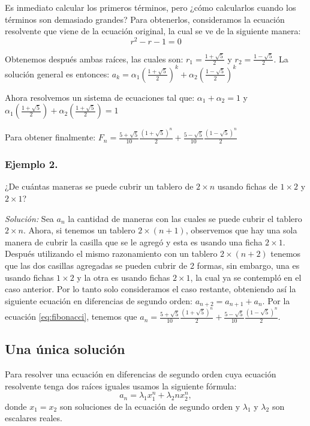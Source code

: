 \documentclass{article}
\begin{document}
Es inmediato calcular los primeros términos, pero ¿cómo calcularlos
cuando los términos son demasiado grandes?  Para obtenerlos,
consideramos la ecuación resolvente que viene de la ecuación original,
la cual se ve de la siguiente manera:
$$r^2-r-1=0$$

Obtenemos después ambas raíces, las cuales son:
$r_{1}= \frac{1+\sqrt{5}}{2}$ y $r_{2}=\frac{1-\sqrt{5}}{2}$. La
solución general es entonces:
$a_{k}=\alpha_{1}(\frac{1+\sqrt{5}}{2})^{k} +
\alpha_{2}(\frac{1-\sqrt{5}}{2})^k$

Ahora resolvemos un sistema de ecuaciones tal que:
$\alpha_{1} + \alpha_{2}= 1$ y
$\alpha_{1}(\frac{1+\sqrt{5}}{2}) + \alpha_{2}(\frac{1+\sqrt{5}}{2})=1$

Para obtener finalmente:
$F_{n}= \frac{5+\sqrt{5}}{10}\frac{(1+\sqrt{5})^n}{2} +
\frac{5-\sqrt{5}}{10}\frac{(1-\sqrt{5})^n}{2}$

\subsubsection{Ejemplo 2.}
\label{sec:fichas}

¿De cuántas maneras se puede cubrir un tablero de $2\times n$ usando
fichas de $1\times 2$ y $2\times 1$?

\textit{Solución:} Sea $a_n$ la cantidad de maneras con las cuales se
puede cubrir el tablero $2\times n$. Ahora, si tenemos un tablero
$2\times (n+1)$, observemos que hay una sola manera de cubrir la
casilla que se le agregó y esta es usando una ficha $2\times 1$.
Después utilizando el mismo razonamiento con un tablero
$2\times (n+2)$ tenemos que las dos casillas agregadas se pueden
cubrir de 2 formas, sin embargo, una es usando fichas $1\times 2$ y la
otra es usando fichas $2\times 1$, la cual ya se contempló en el caso
anterior. Por lo tanto solo consideramos el caso restante, obteniendo
así la siguiente ecuación en diferencias de segundo orden:
$a_{n+2}=a_{n+1}+a_n$.  Por la ecuación \eqref{eq:fibonacci}, tenemos
que
$a_n=\frac{5+\sqrt{5}}{10}\frac{(1+\sqrt{5})^n}{2} +
\frac{5-\sqrt{5}}{10}\frac{(1-\sqrt{5})^n}{2}$.




\subsection{Una única solución}
\label{sec:unica}

Para resolver una ecuación en diferencias de segundo orden cuya
ecuación resolvente tenga dos raíces iguales usamos la siguiente fórmula:
\begin{equation}
 \label{raicesiguales}
 a_n=\lambda_1x_1^n +\lambda_2nx_2^n,
\end{equation}
donde $x_1=x_2$ son soluciones de la ecuación de segundo orden y
$\lambda_1$ y $\lambda_2$ son escalares reales.
\end{document}
